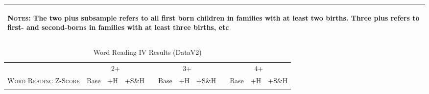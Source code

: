 \begin{landscape}
\begin{table}[htpb!]
\begin{center}
\begin{tabular}{lcccp{2mm}cccp{2mm}ccc}
\midrule\multicolumn{12}{p{19.2cm}}{\begin{footnotesize}\textsc{Notes:} The two plus subsample refers to all first born children in families with at least two births.  Three plus refers to first- and second-borns in families with at least three births, etc\end{footnotesize}} \\ \bottomrule 
\end{tabular}\end{center}\end{table}\end{landscape}\begin{landscape}\begin{table}[htpb!]\caption{Word Reading IV Results (DataV2)}
\label{TWINtab:IVAll}
\begin{center}\begin{tabular}{lcccp{2mm}cccp{2mm}ccc}
\toprule \toprule 
&\multicolumn{3}{c}{2+}&&\multicolumn{3}{c}{3+}&&\multicolumn{3}{c}{4+}\\ \cmidrule(r){2-4} \cmidrule(r){6-8} \cmidrule(r){10-12} 
\textsc{Word Reading Z-Score}&Base&+H&+S\&H&&Base&+H&+S\&H&&Base&+H&+S\&H\\ \midrule 
\begin{footnotesize}\end{footnotesize}& 
\begin{footnotesize}\end{footnotesize}& 
\begin{footnotesize}\end{footnotesize}& 
\begin{footnotesize}\end{footnotesize}& 
\begin{footnotesize}\end{footnotesize}& 
\begin{footnotesize}\end{footnotesize}& 
\begin{footnotesize}\end{footnotesize}& 
\begin{footnotesize}\end{footnotesize}& 
\begin{footnotesize}\end{footnotesize}& 
\begin{footnotesize}\end{footnotesize}& 
\begin{footnotesize}\end{footnotesize}& 
\begin{footnotesize}\end{footnotesize}\\ 

\end{tabular}
\end{center}
\end{table}
\end{landscape}
